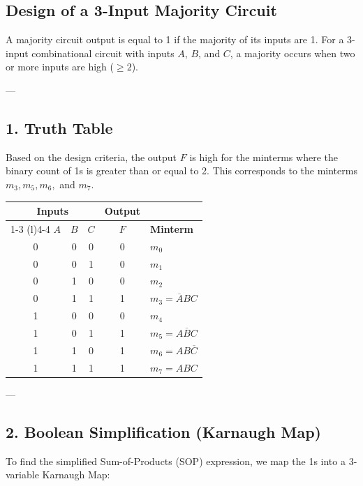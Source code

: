 \documentclass[12pt,a3paper]{article}
\begin{document}
\begin{enumerate}
\begin{tcolorbox}[enhanced,breakable,ansbox,colback=cA!4,colframe=cA,boxrule=0.8pt,arc=5pt,title={\textbf{Answer}},fonttitle=\bfseries\color{white},colbacktitle=cA]

\section*{Design of a 3-Input Majority Circuit}

A majority circuit output is equal to 1 if the majority of its inputs are 1. For a 3-input combinational circuit with inputs $A$, $B$, and $C$, a majority occurs when two or more inputs are high ($\ge 2$).

---

\subsection*{1. Truth Table}
Based on the design criteria, the output $F$ is high for the minterms where the binary count of 1s is greater than or equal to 2. This corresponds to the minterms $m_3, m_5, m_6,$ and $m_7$.

\begin{center}
\begin{tabular}{ccccl}
\toprule
\multicolumn{3}{c}{\textbf{Inputs}} & \textbf{Output} & \\
\cmidrule(r){1-3} \cmidrule(l){4-4}
$A$ & $B$ & $C$ & $F$ & \textbf{Minterm} \\
\midrule
0 & 0 & 0 & 0 & $m_0$ \\
0 & 0 & 1 & 0 & $m_1$ \\
0 & 1 & 0 & 0 & $m_2$ \\
0 & 1 & 1 & 1 & $m_3 = \overline{A}BC$ \\
1 & 0 & 0 & 0 & $m_4$ \\
1 & 0 & 1 & 1 & $m_5 = A\overline{B}C$ \\
1 & 1 & 0 & 1 & $m_6 = AB\overline{C}$ \\
1 & 1 & 1 & 1 & $m_7 = ABC$ \\
\bottomrule
\end{tabular}
\end{center}

---

\subsection*{2. Boolean Simplification (Karnaugh Map)}
To find the simplified Sum-of-Products (SOP) expression, we map the 1s into a 3-variable Karnaugh Map:


\end{tcolorbox}
\end{enumerate}
\end{document}
